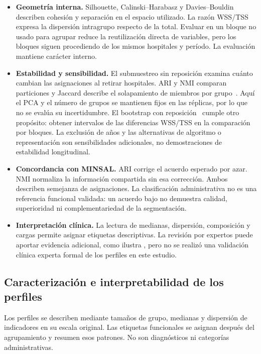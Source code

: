 \begin{itemize}
  \item \textbf{Geometría interna.} Silhouette, Calinski--Harabasz y
    Davies--Bouldin describen cohesión y separación en el espacio utilizado.
    La razón WSS/TSS expresa la dispersión intragrupo respecto de la total.
    Evaluar en un bloque no usado para agrupar reduce la reutilización directa
    de variables, pero los bloques siguen procediendo de los mismos hospitales
    y período. La evaluación mantiene carácter interno.
  \item \textbf{Estabilidad y sensibilidad.} El submuestreo sin reposición
    examina cuánto cambian las asignaciones al retirar hospitales. ARI y NMI
    comparan particiones y Jaccard describe el solapamiento de miembros por
    grupo~\citep{Hennig2007}. Aquí el PCA y el número de grupos se mantienen
    fijos en las réplicas, por lo que no se evalúa su incertidumbre. El
    bootstrap con reposición~\citep{Efron1993} cumple otro propósito: obtener intervalos de las
    diferencias WSS/TSS en la comparación por bloques. La exclusión de años y
    las alternativas de algoritmo o representación son sensibilidades
    adicionales, no demostraciones de estabilidad longitudinal.
  \item \textbf{Concordancia con MINSAL.} ARI corrige el acuerdo esperado por
    azar. NMI normaliza la información compartida sin esa corrección. Ambos
    describen semejanza de asignaciones. La clasificación administrativa no es
    una referencia funcional validada: un acuerdo bajo no demuestra calidad,
    superioridad ni complementariedad de la segmentación.
  \item \textbf{Interpretación clínica.} La lectura de medianas, dispersión,
    composición y cargas permite asignar etiquetas descriptivas. La revisión
    por expertos puede aportar evidencia adicional, como ilustra
    \citet{Wick2022}, pero no se realizó una validación clínica experta formal
    de los perfiles en este estudio.
\end{itemize}

\subsection{Caracterización e interpretabilidad de los perfiles}
\label{sec:interpretabilidad}

Los perfiles se describen mediante tamaños de grupo, medianas y dispersión de
indicadores en su escala original. Las etiquetas funcionales se asignan después
del agrupamiento y resumen esos patrones. No son diagnósticos ni categorías
administrativas.

